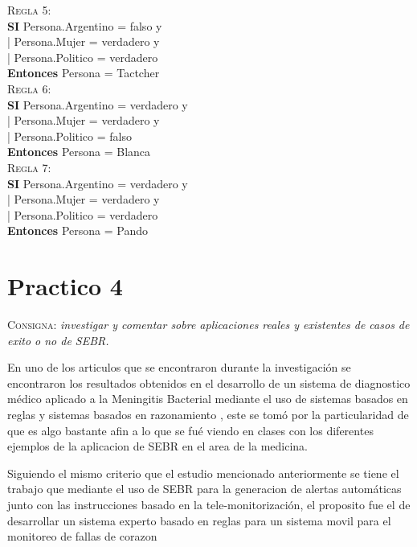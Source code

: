 \documentclass{article}
\begin{document}
\textsc{Regla 5}: \\
\textbf{SI} Persona.Argentino = falso y \\
|    Persona.Mujer = verdadero y \\
|    Persona.Politico = verdadero \\
\textbf{Entonces} Persona = Tactcher\\

\textsc{Regla 6}: \\
\textbf{SI} Persona.Argentino = verdadero y \\
|    Persona.Mujer = verdadero y \\
|    Persona.Politico = falso \\
\textbf{Entonces} Persona = Blanca\\

\textsc{Regla 7}: \\
\textbf{SI} Persona.Argentino = verdadero y \\
|    Persona.Mujer = verdadero y \\
|    Persona.Politico = verdadero \\
\textbf{Entonces} Persona = Pando\\

\section{Practico 4}
\textsc{Consigna}: \textit{investigar y comentar sobre aplicaciones reales y
existentes de casos de exito o no de SEBR.}

En uno de los articulos que se encontraron durante la investigación se
encontraron los resultados obtenidos en el desarrollo de un sistema de
diagnostico médico aplicado a la Meningitis Bacterial mediante el uso de
sistemas basados en reglas y sistemas basados en razonamiento
\cite{cabrera2010}, este se tomó por la particularidad de que es algo bastante
afin a lo que se fué viendo en clases con los diferentes ejemplos de la
aplicacion de SEBR en el area de la medicina.

Siguiendo el mismo criterio que el estudio mencionado anteriormente se tiene el
trabajo que mediante el uso de SEBR para la generacion de alertas automáticas
junto con las instrucciones basado en la tele-monitorización, el proposito fue
el de desarrollar un sistema experto basado en reglas para un sistema movil
para el monitoreo de fallas de corazon \cite{seto2012}


\newpage
\printbibliography[title={Referencias}]
\end{document}
